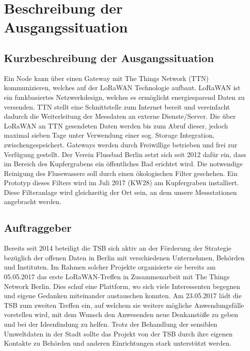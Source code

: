 \section{Beschreibung der Ausgangssituation}

\subsection{Kurzbeschreibung der Ausgangssituation}

Ein Node kann \"uber einen Gateway mit The Things Network (TTN) kommunizieren, welches auf der LoRaWAN Technologie aufbaut.
LoRaWAN ist ein funkbasiertes Netzwerkdesign, welches es ermöglicht energiesparend Daten zu versenden. TTN stellt eine Schnittstelle zum
Internet bereit und vereinfacht dadurch die Weiterleitung der Messdaten an externe Dienste/Server. Die über LoRaWAN an TTN gesendeten Daten
werden bis zum Abruf dieser, jedoch maximal sieben Tage unter Verwendung einer sog. \glqq Storage Integration\grqq{}, zwischengespeichert.
Gateways werden durch Freiwillige betrieben und frei zur Verfügung gestellt.\newline
Der Verein Flussbad Berlin setzt sich seit 2012 dafür ein, dass im Bereich des Kupfergrabens ein öffentliches Bad erichtet wird. Die notwendige Reinigung des Flusswassers soll durch einen ökologischen Filter geschehen. Ein Prototyp dieses Filters wird im Juli 2017 (KW28) am Kupfergraben installiert.
Diese Filteranlage wird gleichzeitig der Ort sein, an dem unsere Messstationen angebracht werden.

\subsection{Auftraggeber}

Bereits seit 2014 beteiligt die TSB sich aktiv an der Förderung der Strategie bezüglich der offenen Daten in Berlin mit verschiedenen Unternehmen, Behörden und Instituten.
Im Rahmen solcher Projekte organisierte sie bereits am 05.05.2017 das erste \glqq LoRaWAN-Treffen\grqq{} in Zusammenarbeit mit The Things Network Berlin. Dies schuf eine Plattform, wo sich viele Interessenten begegnen und eigene Gedanken miteinander austauschen konnten.\newline
Am 23.05.2017 lädt die TSB zum zweiten Treffen ein, auf welchem sie weitere m\"ogliche Anwendungsfälle vorstellen wird, mit dem Wunsch den Anwesenden neue Denkanstöße zu geben und bei der Ideenfindung zu helfen.\newline
Trotz der Behandlung der sensiblen Umweltdaten in der Stadt sollte das Projekt von der TSB durch ihre eigenen Kontakte zu Behörden und anderen Einrichtungen stark unterstützt werden.\newline

